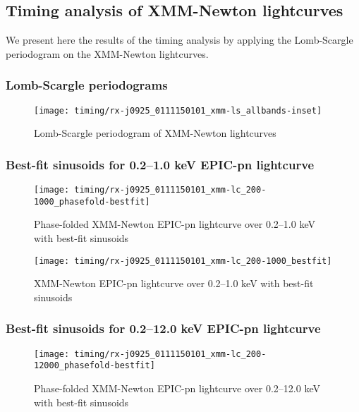 				
		\subsection{Timing analysis of XMM-Newton lightcurves}
		
			We present here the results of the timing analysis by applying the Lomb-Scargle periodogram on the XMM-Newton lightcurves.
			
			\subsubsection{Lomb-Scargle periodograms}
				\begin{figure}[h!]
					\centering
					\texttt{[image: timing/rx-j0925\_0111150101\_xmm-ls\_allbands-inset]}
					\caption{Lomb-Scargle periodogram of XMM-Newton lightcurves}
					\label{result:ls-mrvel-xmm}
				\end{figure}
			
			\subsubsection{Best-fit sinusoids for 0.2--1.0 keV EPIC-pn lightcurve}
				\begin{figure}[h!]
					\centering
					\texttt{[image: timing/rx-j0925\_0111150101\_xmm-lc\_200-1000\_phasefold-bestfit]}
					\caption{Phase-folded XMM-Newton EPIC-pn lightcurve over 0.2--1.0 keV with best-fit sinusoids}
					\label{result:lc-phase-fold-mrvel-xmm:200-1000-bestfit}
				\end{figure}
				
				\begin{figure}[h!]
					\centering
					\texttt{[image: timing/rx-j0925\_0111150101\_xmm-lc\_200-1000\_bestfit]}
					\caption{XMM-Newton EPIC-pn lightcurve over 0.2--1.0 keV with best-fit sinusoids}
					\label{result:lc-mrvel-xmm:200-1000-bestfit}
				\end{figure}
				
			\subsubsection{Best-fit sinusoids for 0.2--12.0 keV EPIC-pn lightcurve}
				\begin{figure}[h!]
					\centering
					\texttt{[image: timing/rx-j0925\_0111150101\_xmm-lc\_200-12000\_phasefold-bestfit]}
					\caption{Phase-folded XMM-Newton EPIC-pn lightcurve over 0.2--12.0 keV with best-fit sinusoids}
					\label{result:lc-phase-fold-mrvel-xmm:200-12000-bestfit}
				\end{figure}
				
